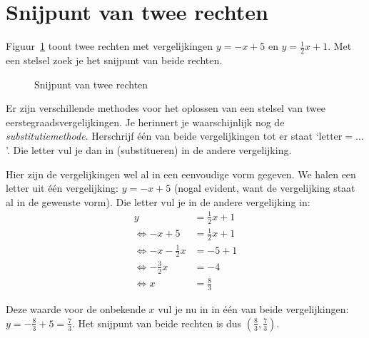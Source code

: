 \section{Snijpunt van twee rechten}
Figuur~\ref{fig:snijdenderechten} toont twee rechten met vergelijkingen $y=-x+5$ en $y=\frac{1}{2}x+1$. Met een stelsel zoek je het snijpunt van beide rechten. 
\begin{figure}[htbp]
    \centering
{}
\caption{Snijpunt van twee rechten}
    \label{fig:snijdenderechten}
\end{figure}

Er zijn verschillende methodes voor het oplossen van een stelsel van twee eerstegraadsvergelijkingen. Je herinnert je waarschijnlijk nog de \emph{substitutiemethode}. Herschrijf één van beide vergelijkingen tot er staat `$\text{letter} = \ldots$'. Die letter vul je dan in (substitueren) in de andere vergelijking.

Hier zijn de vergelijkingen wel al in een eenvoudige vorm gegeven. We halen een letter uit één vergelijking: $y=-x+5$ (nogal evident, want de vergelijking staat al in de gewenste vorm). Die letter vul je in de andere vergelijking in:
\begin{align*}
y&=\frac{1}{2}x+1\\
\Leftrightarrow -x+5&=\frac{1}{2}x+1\\
\Leftrightarrow -x-\frac{1}{2}x&=-5+1\\
\Leftrightarrow -\frac{3}{2}x&=-4\\
\Leftrightarrow x&=\frac{8}{3}
\end{align*}

Deze waarde voor de onbekende $x$ vul je nu in in één van beide vergelijkingen: $y=-\frac{8}{3}+5=\frac{7}{3}$. Het snijpunt van beide rechten is dus $(\frac{8}{3},\frac{7}{3})$.

